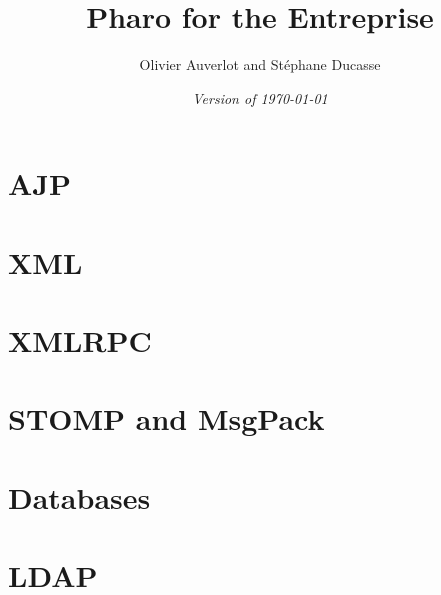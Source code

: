 \documentclass[a4paper,10pt,twoside]{book}
\begin{document}
\frontmatter
\setcounter{page}{1}
\pagestyle{headings}
\author{Olivier Auverlot and St\'ephane Ducasse}
\title{\Huge\textbf{Pharo for the Entreprise}}
\isodate
\date{\emph{Version of \today}}
\maketitle
\tableofcontents
\sloppy %
\mainmatter
\chapter{AJP}

\chapter{XML}

\chapter{XMLRPC}

\chapter{STOMP and MsgPack}

\chapter{Databases}

\chapter{LDAP}






\printindex
\end{document}
